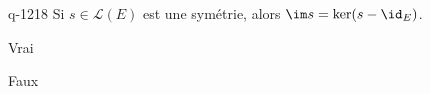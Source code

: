 \begin{truefalse}{q-1218}
Si $s\in\mathcal{L}(E)$ est une symétrie, alors $\im s= \ker (s-\id_E)$.
\item Vrai
\item* Faux
\end{truefalse}


